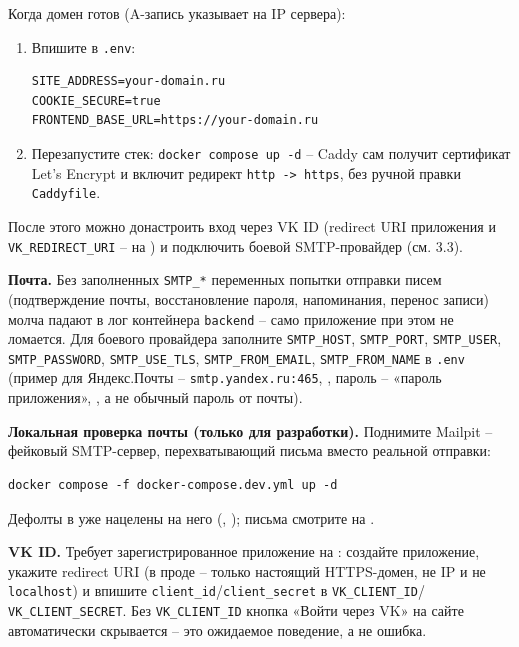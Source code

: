
Когда домен готов (A-запись указывает на IP сервера):
\begin{enumerate}
  \item Впишите в \texttt{.env}:
\begin{verbatim}
SITE_ADDRESS=your-domain.ru
COOKIE_SECURE=true
FRONTEND_BASE_URL=https://your-domain.ru
\end{verbatim}
  \item Перезапустите стек: \texttt{docker compose up -d} -- Caddy сам
        получит сертификат Let's Encrypt и включит редирект
        \texttt{http -> https}, без ручной правки \texttt{Caddyfile}.
\end{enumerate}
После этого можно донастроить вход через VK ID (redirect URI приложения
и \texttt{VK\_REDIRECT\_URI} -- на
) и подключить
боевой SMTP-провайдер (см. 3.3).


\textbf{Почта.} Без заполненных \texttt{SMTP\_*} переменных попытки
отправки писем (подтверждение почты, восстановление пароля,
напоминания, перенос записи) молча падают в лог контейнера
\texttt{backend} -- само приложение при этом не ломается. Для боевого
провайдера заполните \texttt{SMTP\_HOST}, \texttt{SMTP\_PORT},
\texttt{SMTP\_USER}, \texttt{SMTP\_PASSWORD}, \texttt{SMTP\_USE\_TLS},
\texttt{SMTP\_FROM\_EMAIL}, \texttt{SMTP\_FROM\_NAME} в \texttt{.env}
(пример для Яндекс.Почты -- \texttt{smtp.yandex.ru:465},
, пароль -- «пароль приложения»,
, а не обычный пароль от почты).

\textbf{Локальная проверка почты (только для разработки).} Поднимите
Mailpit -- фейковый SMTP-сервер, перехватывающий письма вместо реальной
отправки:
\begin{verbatim}
docker compose -f docker-compose.dev.yml up -d
\end{verbatim}
Дефолты в  уже нацелены на него
(, ); письма
смотрите на .

\textbf{VK ID.} Требует зарегистрированное приложение на
: создайте приложение, укажите redirect URI
 (в проде -- только
настоящий HTTPS-домен, не IP и не \texttt{localhost}) и впишите
\texttt{client\_id}/\texttt{client\_secret} в \texttt{VK\_CLIENT\_ID}/
\texttt{VK\_CLIENT\_SECRET}. Без \texttt{VK\_CLIENT\_ID} кнопка «Войти
через VK» на сайте автоматически скрывается -- это ожидаемое поведение,
а не ошибка.

